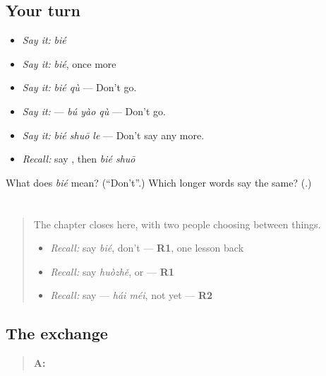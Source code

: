 \subsection*{Your turn}
\begin{itemize}
\raggedright
  \item \emph{Say it:} \emph{bié}
  \item \emph{Say it:} \emph{bié}, once more
  \item \emph{Say it:} \emph{bié qù} — Don't go.
  \item \emph{Say it:}  — \emph{bú yào qù} — Don't go.
  \item \emph{Say it:} \emph{bié shuō le} — Don't say any more.
  \item \emph{Recall:} say , then \emph{bié shuō}
\end{itemize}

\begin{tcolorbox}[breakable,colback=teal!4,colframe=teal!35!black,title={Before you move on}]
What does \emph{bié} mean? (\textquotedblleft{}Don't\textquotedblright{}.) Which longer words say the same? (\textbf{}.)
\end{tcolorbox}
\section[Practice]{}

\label{lesson:ZH-C154-practice}



\begin{quote}
The chapter closes here, with two people choosing between things.

\begin{itemize}
\raggedright
  \item \emph{Recall:} say \emph{bié}, don't — \textbf{R1}, one lesson back
  \item \emph{Recall:} say \emph{huòzhě}, or — \textbf{R1}
  \item \emph{Recall:} say  — \emph{hái méi}, not yet — \textbf{R2}
\end{itemize}
\end{quote}

\subsection*{The exchange}
\begin{quote}
\textbf{A:} 
\end{quote}

